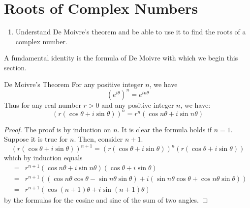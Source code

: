 \section{Roots of Complex Numbers}

\begin{outcome}
\begin{enumerate}
\item[A.] Understand De Moivre's theorem and be able to use it to find the
roots of a complex number.
\end{enumerate}
\end{outcome}

A fundamental identity is the
 formula of De Moivre with which we begin this section.

\begin{theorem}{De Moivre's Theorem}\label{thm:demoivretheorem}
For any positive integer $n$, we have
\begin{equation*}
\left( e^{i \theta} \right)^n = e^{i n \theta}
\end{equation*}
Thus for any real number $r>0$ and any positive integer $n$, we have:
\begin{equation*}
\left( r\left( \cos \theta+i\sin \theta\right) \right) ^{n}=r^{n}\left( \cos n \theta +i\sin
n\theta\right) 
\end{equation*}
\end{theorem}

\begin{proof}
 The proof is by induction on $n$. It is clear the formula holds if $n=1.$ Suppose it is true
for $n.$ Then, consider $n+1$.
\begin{equation*}
\left( r\left( \cos \theta+i\sin \theta\right) \right) ^{n+1}=\left( r\left( \cos
\theta+i\sin \theta\right) \right) ^{n}\left( r\left( \cos \theta+i\sin \theta\right) \right)
\end{equation*}
which by induction equals
\begin{eqnarray*}
&=&r^{n+1}\left( \cos n\theta+i\sin n\theta\right) \left( \cos \theta+i\sin \theta\right) \\
&=& r^{n+1}\left( \left( \cos n\theta\cos \theta-\sin n\theta\sin \theta\right) +i\left( \sin
n\theta\cos \theta+\cos n\theta\sin \theta\right) \right)\\
&=&r^{n+1}\left( \cos \left( n+1\right) \theta+i\sin \left( n+1\right) \theta\right)
\end{eqnarray*}
by the formulas for the cosine and sine of the sum of two angles. 
\end{proof}

